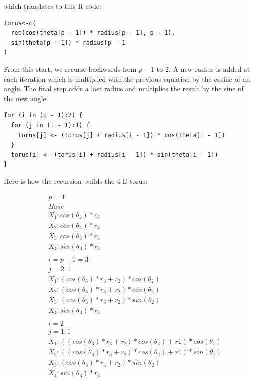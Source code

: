\noindent which translates to this R code:

\begin{verbatim}
torus<-c(
  rep(cos(theta[p - 1]) * radius[p - 1], p - 1),
  sin(theta[p - 1]) * radius[p - 1]
)
\end{verbatim}

From this start, we recurse backwards from $p-1$ to 2. A new radius is
added at each iteration which is multiplied with the previous equation
by the cosine of an angle. The final step adds a last radius and
multiplies the result by the sine of the new angle.

\begin{verbatim}
for (i in (p - 1):2) {
  for (j in (i - 1):1) {
    torus[j] <- (torus[j] + radius[i - 1]) * cos(theta[i - 1])
  }
  torus[i] <- (torus[i] + radius[i - 1]) * sin(theta[i - 1])
}
\end{verbatim}

Here is how the recursion builds the 4-D torus:

\begin{eqnarray*}
&&p=4\\
&&Base\\
&&X_1: cos(\theta_3) * r_3\\
&&X_2: cos(\theta_3) * r_3\\
&&X_3: cos(\theta_3) * r_3\\
&&X_4: sin(\theta_3) * r_3\\
\\
&&i=p-1=3\\
&&j=2:1\\
&&X_1: (cos(\theta_3) * r_3 + r_2) * cos(\theta_2)\\
&&X_2: (cos(\theta_3) * r_3 + r_2) * cos(\theta_2)\\
&&X_3: (cos(\theta_3) * r_3 + r_2) * sin(\theta_2)\\
&&X_4: sin(\theta_3) * r_3\\
\\
&&i=2\\
&&j=1:1\\
&&X_1: ((cos(\theta_3) * r_3 + r_2) * cos(\theta_2) + r1) * cos(\theta_1)\\
&&X_2: ((cos(\theta_3) * r_3 + r_2) * cos(\theta_2) + r1) * sin(\theta_1)\\
&&X_3: (cos(\theta_3) * r_3 + r_2) * sin(\theta_2)\\
&&X_4: sin(\theta_3) * r_3\\
\end{eqnarray*}

